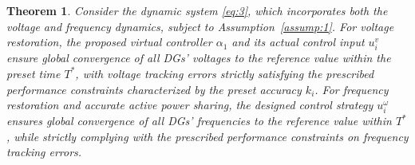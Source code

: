 \documentclass[]{interact}
\theoremstyle{plain}%
\newtheorem{theorem}{Theorem}
\theoremstyle{definition}
\theoremstyle{remark}
\begin{document}
\begin{theorem}
Consider the dynamic system \eqref{eq:3}, which incorporates both the voltage and frequency dynamics, subject to Assumption~\ref{assump:1}. For voltage restoration, the proposed virtual controller $\alpha_1$ and its actual control input \(u_i^v\) ensure global convergence of all DGs' voltages to the reference value within the preset time \(T^*\), with voltage tracking errors strictly satisfying the prescribed performance constraints characterized by the preset accuracy \(k_i\). For frequency restoration and accurate active power sharing, the designed control strategy \(u_i^\omega\) ensures global convergence of all DGs' frequencies to the reference value within \(T^*\), while strictly complying with the prescribed performance constraints on frequency tracking errors.
\end{theorem}
\end{document}
